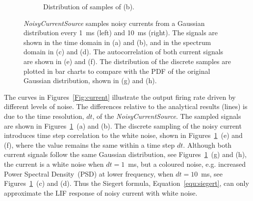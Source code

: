 \begin{figure}[tbp!]
\begin{subfigure}[t]{0.43\textwidth}
			\caption{Distribution of samples of (b).}
		\end{subfigure}
		\caption[\textit{NoisyCurrentSource} samples from a Gaussian distribution.]{\textit{NoisyCurrentSource} samples noisy currents from a Gaussian distribution every 1~ms (left) and 10~ms (right). The signals are shown in the time domain in (a) and (b), and in the spectrum domain in (c) and (d). The autocorrelation of both current signals are shown in (e) and (f). The distribution of the discrete samples are plotted in bar charts to compare with the PDF of the original Gaussian distribution, shown in (g) and (h).}
		\label{Fig:lif_curr}
	\end{figure}

	The curves in Figures~\ref{Fig:current} illustrate the output firing rate driven by different levels of noise.
	The differences relative to the analytical results (\DIFdelbegin {}\DIFdelend \DIFaddbegin {}\DIFaddend lines) is due to the time resolution, $dt$, of the \textit{NoisyCurrentSource}.
	The sampled signals are shown in Figures~\ref{Fig:lif_curr}~(a) and (b).
	The discrete sampling of the noisy current introduces time step correlation to the white noise, shown in Figures~\ref{Fig:lif_curr}~(e) and (f), where the value remains the same within a time step $dt$.
	Although both current signals follow the same Gaussian distribution, see Figures~\ref{Fig:lif_curr}~(g) and (h), the current is \DIFaddbegin {}\DIFaddend a white noise when $dt=1$~ms, but a coloured noise, e.g. increased Power Spectral Density~(PSD) at lower frequency, when $dt=10$~ms, see Figures~\ref{Fig:lif_curr}~(c) and (d).
	Thus the Siegert formula, Equation~\ref{equ:siegert}, can only approximate the LIF response of noisy current with white noise.
